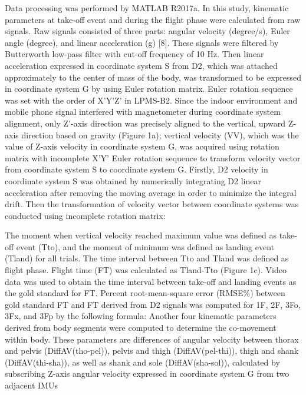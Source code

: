 \documentclass[12pt,journal,compsoc]{IEEEtran}
\begin{document}
Data processing was performed by MATLAB R2017a. In this study, kinematic parameters at
take-off event and during the flight phase were calculated from raw signals. Raw signals consisted
of three parts: angular velocity (degree/s), Euler angle (degree), and linear acceleration (g) [8]. These
signals were filtered by Butterworth low-pass filter with cut-off frequency of 10 Hz. Then linear
acceleration expressed in coordinate system S from D2, which was attached approximately to the
center of mass of the body, was transformed to be expressed in coordinate system G by using Euler
rotation matrix. Euler rotation sequence was set with the order of X’Y’Z’ in LPMS-B2. Since the indoor
environment and mobile phone signal interfered with magnetometer during coordinate system
alignment, only Z’-axis direction was precisely aligned to the vertical, upward Z-axis direction based
on gravity (Figure 1a); vertical velocity (VV), which was the value of Z-axis velocity in coordinate
system G, was acquired using rotation matrix with incomplete X’Y’ Euler rotation sequence to
transform velocity vector from coordinate system S to coordinate system G. Firstly, D2 velocity in
coordinate system S was obtained by numerically integrating D2 linear acceleration after removing
the moving average in order to minimize the integral drift. Then the transformation of velocity vector
between coordinate systems was conducted using incomplete rotation matrix: 

The moment when vertical velocity reached maximum value was defined as take-off event (Tto), and
the moment of minimum was defined as landing event (Tland) for all trials. The time interval between
Tto and Tland was defined as flight phase. Flight time (FT) was calculated as Tland-Tto (Figure 1c).
Video data was used to obtain the time interval between take-off and landing events as the gold
standard for FT. Percent root-mean-square error (RMSE\%) between gold standard FT and FT derived
from D2 signals was computed for 1F, 2F, 3Fo, 3Fx, and 3Fp by the following formula: 
Another four kinematic parameters derived from body segments were computed to determine
the co-movement within body. These parameters are differences of angular velocity between thorax
and pelvis (DiffAV(tho-pel)), pelvis and thigh (DiffAV(pel-thi)), thigh and shank (DiffAV(thi-sha)),
as well as shank and sole (DiffAV(sha-sol)), calculated by subscribing Z-axis angular velocity
expressed in coordinate system G from two adjacent IMUs
\end{document}
